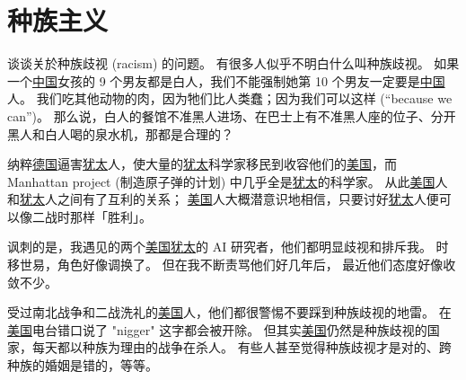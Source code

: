 \documentclass[12pt]{report}
\begin{document}


\chapter{种族主义}

谈谈关於种族歧视 (racism) 的问题。 有很多人似乎不明白什么叫种族歧视。 如果一个\uline{中国}女孩的 9 个男友都是白人，我们不能强制她第 10 个男友一定要是\uline{中国}人。 我们吃其他动物的肉，因为牠们比人类蠢；因为我们可以这样 (``because we can'')。 那么说，白人的餐馆不准黑人进场、在巴士上有不准黑人座的位子、分开黑人和白人喝的泉水机，那都是合理的？

纳粹\uline{德国}逼害\uline{犹太}人，使大量的\uline{犹太}科学家移民到收容他们的\uline{美国}，而 Manhattan project (制造原子弹的计划) 中几乎全是\uline{犹太}的科学家。 从此\uline{美国}人和\uline{犹太}人之间有了互利的关系； \uline{美国}人大概潜意识地相信，只要讨好\uline{犹太}人便可以像二战时那样「胜利」。

讽刺的是，我遇见的两个\uline{美国}\uline{犹太}的 AI 研究者，他们都明显歧视和排斥我。 时移世易，角色好像调换了。 但在我不断责骂他们好几年后， 最近他们态度好像收敛不少。

受过南北战争和二战洗礼的\uline{美国}人，他们都很警惕不要踩到种族歧视的地雷。 在\uline{美国}电台错口说了 "nigger" 这字都会被开除。 但其实\uline{美国}仍然是种族歧视的国家，每天都以种族为理由的战争在杀人。 有些人甚至觉得种族歧视才是对的、跨种族的婚姻是错的，等等。
\end{document}
